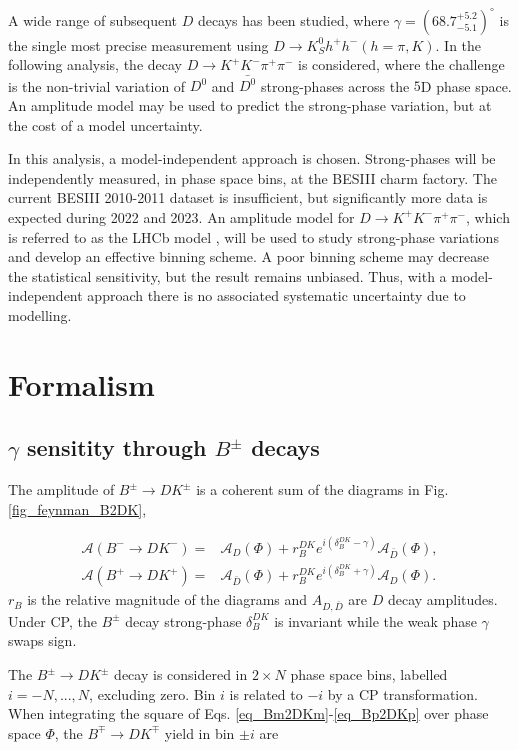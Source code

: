 \documentclass[12pt, a4paper, notitlepage, onecolumn]{article}
\begin{document}
A wide range of subsequent $D$ decays has been studied, where $\gamma = (68.7^{+5.2}_{-5.1})^\circ$ is the single most precise measurement using $D\to K_S^0h^+h^-(h = \pi, K)$\cite{cite_LHCbGGSZKSpipi}. In the following analysis, the decay $D\to K^+K^-\pi^+\pi^-$ is considered, where the challenge is the non-trivial variation of $D^0$ and $\bar{D^0}$ strong-phases across the $5$D phase space. An amplitude model may be used to predict the strong-phase variation, but at the cost of a model uncertainty.

In this analysis, a model-independent approach is chosen. Strong-phases will be independently measured, in phase space bins, at the BESIII charm factory. The current BESIII 2010-2011 dataset is insufficient, but significantly more data is expected during 2022 and 2023. An amplitude model for $D\to K^+K^-\pi^+\pi^-$, which is referred to as the LHCb model \cite{cite_AmplitudeModel}, will be used to study strong-phase variations and develop an effective binning scheme. A poor binning scheme may decrease the statistical sensitivity, but the result remains unbiased. Thus, with a model-independent approach there is no associated systematic uncertainty due to modelling.

\section{Formalism}
\subsection{\texorpdfstring{$\gamma$}{gamma} sensitity through \texorpdfstring{$B^\pm$}{B} decays}
The amplitude of $B^\pm\to DK^\pm$ is a coherent sum of the diagrams in Fig. \ref{fig_feynman_B2DK},

\begin{align}
  \mathcal{A}(B^-\to DK^-) =& \mathcal{A}_D(\Phi) + r_B^{DK}e^{i(\delta_B^{DK} - \gamma)}\mathcal{A}_{\bar{D}}(\Phi), \label{eq_Bm2DKm} \\
  \mathcal{A}(B^+\to DK^+) =& \mathcal{A}_{\bar{D}}(\Phi) + r_B^{DK}e^{i(\delta_B^{DK} + \gamma)}\mathcal{A}_D(\Phi). \label{eq_Bp2DKp}
\end{align}
$r_B$ is the relative magnitude of the diagrams and $A_{D, \bar{D}}$ are $D$ decay amplitudes. Under CP, the $B^\pm$ decay strong-phase $\delta_B^{DK}$ is invariant while the weak phase $\gamma$ swaps sign.

The $B^\pm\to DK^\pm$ decay is considered in $2\times N$ phase space bins, labelled $i = -N, ..., N$, excluding zero. Bin $i$ is related to $-i$ by a CP transformation. When integrating the square of Eqs. \eqref{eq_Bm2DKm}-\eqref{eq_Bp2DKp} over phase space $\Phi$, the $B^\mp\to DK^\mp$ yield in bin $\pm i$ are
\end{document}
